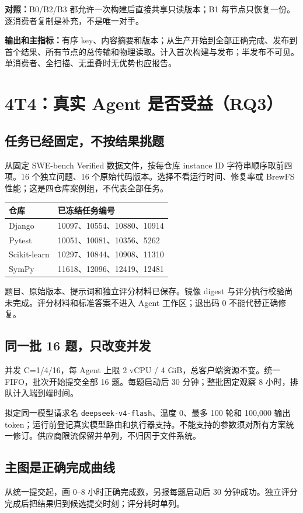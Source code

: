\documentclass[UTF8,11pt,a4paper,fontset=windows]{ctexart}
\begin{document}
\textbf{对照：}B0/B2/B3 都允许一次构建后直接共享只读版本；B1 每节点只恢复一份。逐消费者复制是补充，不是唯一对手。

\textbf{输出和主指标：}有序 key、内容摘要和版本；从生产开始到全部正确完成、发布到首个结果、所有节点的总传输和物理读取。计入首次构建与发布；半发布不可见。单消费者、全扫描、无重叠时无优势也应报告。
\newpage

\section*{4\quad T4：真实 Agent 是否受益（RQ3）}
\subsection*{任务已经固定，不按结果挑题}
从固定 SWE-bench Verified 数据文件，按每仓库 instance ID 字符串顺序取前四项。16 个独立问题、16 个原始代码版本。选择不看运行时间、修复率或 BrewFS 性能；这是四仓库案例组，不代表全部任务。

{\small\begin{tabularx}{\linewidth}{@{}P{31mm}Y@{}}
\toprule
仓库 & 已冻结任务编号\\
\midrule
Django & 10097、10554、10880、10914\\
Pytest & 10051、10081、10356、5262\\
Scikit-learn & 10297、10844、10908、11310\\
SymPy & 11618、12096、12419、12481\\
\bottomrule
\end{tabularx}}

题目、原始版本、提示词和独立评分材料已保存。镜像 digest 与评分执行校验尚未完成。评分材料和标准答案不进入 Agent 工作区；退出码 0 不能代替正确修复。

\subsection*{同一批 16 题，只改变并发}
并发 C=1/4/16，每 Agent 上限 2 vCPU / 4 GiB，总客户端资源不变。统一 FIFO，批次开始提交全部 16 题。每题启动后 30 分钟；整批固定观察 8 小时，排队计入端到端时间。

拟定同一模型请求名 \texttt{deepseek-v4-flash}、温度 0、最多 100 轮和 100,000 输出 token；运行前登记真实模型路由和执行器支持。不能支持的参数须对所有方案统一修订。供应商限流保留并单列，不归因于文件系统。

\subsection*{主图是正确完成曲线}
从统一提交起，画 0--8 小时正确完成数，另报每题启动后 30 分钟成功。独立评分完成后把结果归到候选提交时刻；评分耗时单列。
\end{document}
